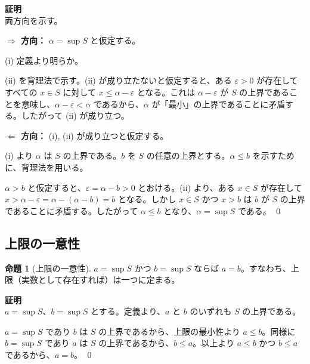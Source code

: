 \documentclass[11pt,a4paper]{jsarticle}
\theoremstyle{definition}
\newtheorem{proposition}{命題}[section]
\newcommand{\eps}{\varepsilon}
\begin{document}
\begin{proofbox}
\textbf{証明}\ \\
\noindent
両方向を示す。

\textbf{$\Rightarrow$ 方向：} $\alpha = \sup S$ と仮定する。

(i) 定義より明らか。

(ii) を背理法で示す。(ii) が成り立たないと仮定すると、ある $\eps > 0$ が存在してすべての $x \in S$ に対して $x \leq \alpha - \eps$ となる。これは $\alpha - \eps$ が $S$ の上界であることを意味し、$\alpha - \eps < \alpha$ であるから、$\alpha$ が「最小」の上界であることに矛盾する。したがって (ii) が成り立つ。

\textbf{$\Leftarrow$ 方向：} (i), (ii) が成り立つと仮定する。

(i) より $\alpha$ は $S$ の上界である。$b$ を $S$ の任意の上界とする。$\alpha \leq b$ を示すために、背理法を用いる。

$\alpha > b$ と仮定すると、$\eps = \alpha - b > 0$ とおける。(ii) より、ある $x \in S$ が存在して $x > \alpha - \eps = \alpha - (\alpha - b) = b$ となる。しかし $x \in S$ かつ $x > b$ は $b$ が $S$ の上界であることに矛盾する。したがって $\alpha \leq b$ となり、$\alpha = \sup S$ である。 \qed
\end{proofbox}

\subsection{上限の一意性}

\begin{propbox}[命題：上限の一意性]
\begin{proposition}[上限の一意性]\label{prop:uniqueness}
$a = \sup S$ かつ $b = \sup S$ ならば $a = b$。すなわち、上限（実数として存在すれば）は一つに定まる。
\end{proposition}
\end{propbox}

\begin{proofbox}
\textbf{証明}\ \\
\noindent
$a = \sup S$、$b = \sup S$ とする。定義より、$a$ と $b$ のいずれも $S$ の上界である。

$a = \sup S$ であり $b$ は $S$ の上界であるから、上限の最小性より $a \leq b$。同様に $b = \sup S$ であり $a$ は $S$ の上界であるから、$b \leq a$。以上より $a \leq b$ かつ $b \leq a$ であるから、$a = b$。 \qed
\end{proofbox}
\end{document}
